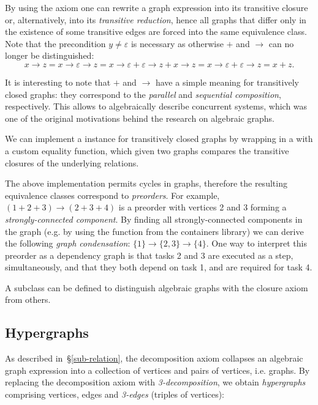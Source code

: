 By using the axiom one can rewrite a graph expression into its transitive closure or,
alternatively, into its \emph{transitive reduction}, hence all graphs that differ only in the
existence of some transitive edges are forced into the same equivalence class. Note that the
precondition $y \neq \varepsilon$ is necessary as otherwise $+$ and $\rightarrow$ can no
longer be distinguished:
\[
x \rightarrow z = x \rightarrow \varepsilon \rightarrow z = x \rightarrow \varepsilon
 + \varepsilon \rightarrow z + x \rightarrow z = x \rightarrow \varepsilon
 + \varepsilon \rightarrow z = x + z.
\]

It is interesting to note that $+$ and $\rightarrow$ have a simple meaning for transitively
closed graphs: they correspond to the \emph{parallel} and \emph{sequential composition},
respectively. This allows to algebraically describe concurrent systems, which was one
of the original motivations behind the research on algebraic graphs.

We can implement a  instance for transitively closed graphs by wrapping
 in a  with a custom equality function, which given two
graphs compares the transitive closures of the underlying relations.

The above implementation permits cycles in graphs, therefore the resulting equivalence
classes correspond to \emph{preorders}. For example, $(1 + 2 + 3) \rightarrow (2 + 3 + 4)$
is a preorder with vertices 2 and 3 forming a \emph{strongly-connected component}. By
finding all strongly-connected components in the graph (e.g. by using the function 
from the \textsf{containers} library) we can derive the following \emph{graph condensation}:
$\{1\} \rightarrow \{2, 3\} \rightarrow \{4\}$. One way to interpret this preorder as a
dependency graph is that tasks 2 and 3 are executed as a step,
simultaneously, and that they both depend on task 1, and are required for task 4.

A subclass  can be defined to distinguish
algebraic graphs with the closure axiom from others.

\subsection{Hypergraphs}

As described in~\S\ref{sub-relation}, the decomposition axiom collapses an algebraic
graph expression into a collection of vertices and pairs of vertices, i.e. graphs. By replacing
the decomposition axiom with \emph{3-decomposition}, we obtain \emph{hypergraphs} comprising
vertices, edges and \emph{3-edges} (triples of vertices):

